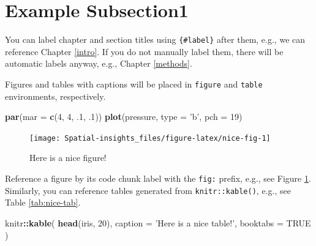 \documentclass[
]{book}
\newenvironment{Shaded}{\begin{snugshade}}{\end{snugshade}}
\newcommand{\DataTypeTok}[1]{\textcolor[rgb]{0.13,0.29,0.53}{#1}}
\newcommand{\DecValTok}[1]{\textcolor[rgb]{0.00,0.00,0.81}{#1}}
\newcommand{\FloatTok}[1]{\textcolor[rgb]{0.00,0.00,0.81}{#1}}
\newcommand{\KeywordTok}[1]{\textcolor[rgb]{0.13,0.29,0.53}{\textbf{#1}}}
\newcommand{\NormalTok}[1]{#1}
\newcommand{\OperatorTok}[1]{\textcolor[rgb]{0.81,0.36,0.00}{\textbf{#1}}}
\newcommand{\OtherTok}[1]{\textcolor[rgb]{0.56,0.35,0.01}{#1}}
\newcommand{\StringTok}[1]{\textcolor[rgb]{0.31,0.60,0.02}{#1}}
\begin{document}
\hypertarget{Example-1}{%
\section{Example Subsection1}\label{Example-1}}

You can label chapter and section titles using \texttt{\{\#label\}} after them, e.g., we can reference Chapter \ref{intro}. If you do not manually label them, there will be automatic labels anyway, e.g., Chapter \ref{methods}.

Figures and tables with captions will be placed in \texttt{figure} and \texttt{table} environments, respectively.

\begin{Shaded}
\begin{Highlighting}[]
\KeywordTok{par}\NormalTok{(}\DataTypeTok{mar =} \KeywordTok{c}\NormalTok{(}\DecValTok{4}\NormalTok{, }\DecValTok{4}\NormalTok{, }\FloatTok{.1}\NormalTok{, }\FloatTok{.1}\NormalTok{))}
\KeywordTok{plot}\NormalTok{(pressure, }\DataTypeTok{type =} \StringTok{'b'}\NormalTok{, }\DataTypeTok{pch =} \DecValTok{19}\NormalTok{)}
\end{Highlighting}
\end{Shaded}

\begin{figure}

{\centering \texttt{[image: Spatial-insights\_files/figure-latex/nice-fig-1]} 

}

\caption{Here is a nice figure!}\label{fig:nice-fig}
\end{figure}

Reference a figure by its code chunk label with the \texttt{fig:} prefix, e.g., see Figure \ref{fig:nice-fig}. Similarly, you can reference tables generated from \texttt{knitr::kable()}, e.g., see Table \ref{tab:nice-tab}.

\begin{Shaded}
\begin{Highlighting}[]
\NormalTok{knitr}\OperatorTok{::}\KeywordTok{kable}\NormalTok{(}
  \KeywordTok{head}\NormalTok{(iris, }\DecValTok{20}\NormalTok{), }\DataTypeTok{caption =} \StringTok{'Here is a nice table!'}\NormalTok{,}
  \DataTypeTok{booktabs =} \OtherTok{TRUE}
\NormalTok{)}
\end{Highlighting}
\end{Shaded}
\end{document}
